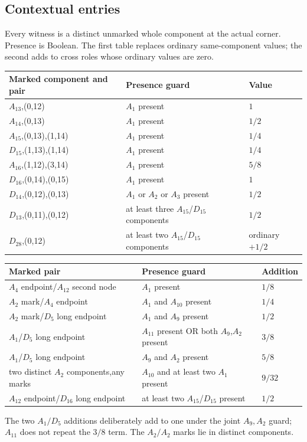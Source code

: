 \documentclass[11pt]{article}
\theoremstyle{remark}\newtheorem{remark}[theorem]{Remark}
\begin{document}
\subsection{Contextual entries}
Every witness is a distinct unmarked whole component at the actual
corner. Presence is Boolean. The first table replaces ordinary
same-component values; the second adds to cross roles whose
ordinary values are zero.

{\small
\begin{longtable}{p{}p{}p{}}
\toprule Marked component and pair&Presence guard&Value\\\midrule
\endhead
 $A_{13}$,(0,12) & $A_{1}$ present & $1$ \\
 $A_{14}$,(0,13) & $A_{1}$ present & $1/2$ \\
 $A_{15}$,(0,13),(1,14) & $A_{1}$ present & $1/4$ \\
 $D_{15}$,(1,13),(1,14) & $A_{1}$ present & $1/4$ \\
 $A_{16}$,(1,12),(3,14) & $A_{1}$ present & $5/8$ \\
 $D_{16}$,(0,14),(0,15) & $A_{1}$ present & $1$ \\
 $D_{14}$,(0,12),(0,13) & $A_{1}$ or $A_{2}$ or $A_{3}$ present & $1/2$ \\
 $D_{13}$,(0,11),(0,12) & at least three $A_{15}$/$D_{15}$ components & $1/2$ \\
 $D_{28}$,(0,12) & at least two $A_{15}$/$D_{15}$ components & ordinary $+1/2$ \\
\bottomrule
\end{longtable}
\begin{longtable}{p{}p{}p{}}
\toprule Marked pair&Presence guard&Addition\\\midrule
\endhead
 $A_{4}$ endpoint/$A_{12}$ second node & $A_{1}$ present & $1/8$ \\
 $A_{2}$ mark/$A_{4}$ endpoint & $A_{1}$ and $A_{10}$ present & $1/4$ \\
 $A_{2}$ mark/$D_{5}$ long endpoint & $A_{1}$ and $A_{9}$ present & $1/2$ \\
 $A_{1}$/$D_{5}$ long endpoint & $A_{11}$ present OR both $A_{9}$,$A_{2}$ present & $3/8$ \\
 $A_{1}$/$D_{5}$ long endpoint & $A_{9}$ and $A_{2}$ present & $5/8$ \\
 two distinct $A_{2}$ components,any marks & $A_{10}$ and at least two $A_{1}$ present & $9/32$ \\
 $A_{12}$ endpoint/$D_{16}$ long endpoint & at least two $A_{15}$/$D_{15}$ present & $1/2$ \\
\bottomrule
\end{longtable}
}
The two $A_1/D_5$ additions deliberately add to one under the
joint $A_9,A_2$ guard; $A_{11}$ does not repeat the $3/8$ term.
The $A_2/A_2$ marks lie in distinct components.
\end{document}
